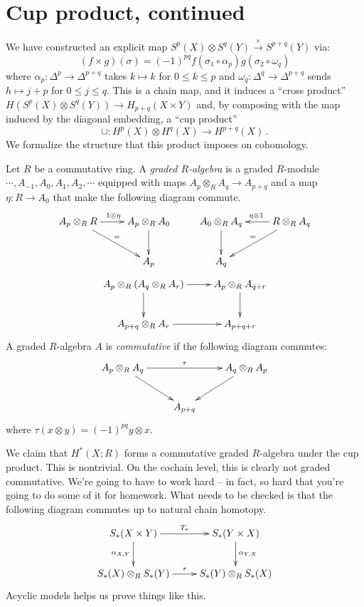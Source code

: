 \section{Cup product, continued}
We have constructed an explicit map $S^p(X)\otimes S^q(Y)\xrightarrow{\times} S^{p+q}(Y)$ via:
\begin{equation*}
(f\times g)(\sigma)=(-1)^{pq}f(\sigma_1\circ\alpha_p)g(\sigma_2\circ\omega_q)
\end{equation*}
where $\alpha_p:\Delta^p\to\Delta^{p+q}$ takes $k\mapsto k$ for 
$0\leq k\leq p$ and $\omega_q:\Delta^q\to\Delta^{p+q}$ sends $h\mapsto j+p$ 
for  $0\leq j\leq q$. This is a chain map, and it induces a ``cross product''
$ H(S^p(X)\otimes S^q(Y))\to H_{p+q}(X\times Y)$ and, by composing with the
map induced by the diagonal embedding, a ``cup product''
\[
\cup:H^p(X)\otimes H^q(X)\to H^{p+q}(X)\,.
\]
We formalize the structure that this product imposes on cohomology.
\begin{definition}
Let $R$ be a commutative ring. A \emph{graded $R$-algebra} is a graded $R$-module $\cdots,A_{-1},A_0, A_1,A_2,\cdots$ equipped with maps $A_p\otimes_R A_q\to A_{p+q}$ and a map $\eta:R\to A_0$ that make the following diagram commute.
\[
\xymatrix{
A_p\otimes_R R \ar[r]^{1\otimes\eta} \ar[dr]^= &A_p\otimes_R A_0 \ar[d] &
A_0\otimes_R A_q \ar[d] & R\otimes_R A_q \ar[l]_{\eta\otimes1} \ar[dl]_= \\
& A_p & A_q 
}\]
\begin{equation*}
\xymatrix{
A_p\otimes_R (A_q\otimes_R A_r)\ar[r]\ar[d] & A_p\otimes_R A_{q+r}\ar[d]\\
A_{p+q}\otimes_R A_r \ar[r] & A_{p+q+r}
}
\end{equation*}
A graded $R$-algebra $A$ is {\em commutative} if the following diagram commutes:
\begin{equation*}
\xymatrix{
	A_p\otimes_R A_q\ar[rr]^{\tau}\ar[dr] & & A_q\otimes_R A_p \ar[dl]\\
	 & A_{p+q} & 
}
\end{equation*}
where $\tau(x\otimes y)=(-1)^{pq}y\otimes x$. 
\end{definition}
We claim that $ H^\ast(X;R)$ forms a commutative graded $R$-algebra under the cup product. This is nontrivial. On the cochain level, this is clearly not graded commutative. We're going to have to work hard -- in fact, so hard that you're going to do some of it for homework. What needs to be checked is that the following 
diagram commutes up to natural chain homotopy.
\begin{equation*}
\xymatrix{S_\ast(X\times Y)\ar[r]^{T_\ast}\ar[d]_{\alpha_{X,Y}} & S_\ast(Y\times X)\ar[d]^{\alpha_{Y,X}}\\
S_\ast(X)\otimes_R S_\ast(Y)\ar[r]^{\tau} & S_\ast(Y)\otimes_R S_\ast(X)}
\end{equation*}
Acyclic models helps us prove things like this.

